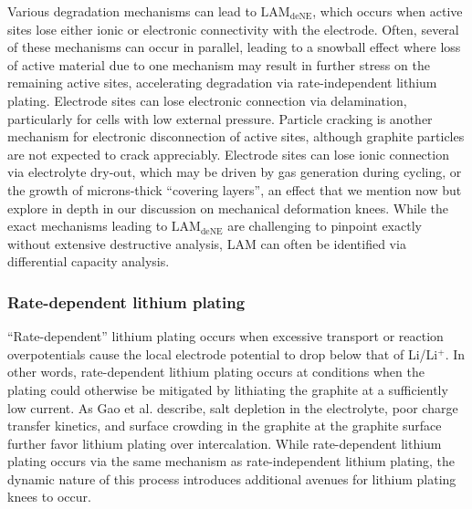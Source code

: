 \documentclass[journal=jpclcd,manuscript=article]{achemso}
\begin{document}
Various degradation mechanisms can lead to $\mathrm{LAM_{deNE}}$, which occurs when active sites lose either ionic or electronic connectivity with the electrode.
Often, several of these mechanisms can occur in parallel, leading to a snowball effect where loss of active material due to one mechanism may result in further stress on the remaining active sites, accelerating degradation via rate-independent lithium plating.
Electrode sites can lose electronic connection via delamination\cite{liu_aging_2010, cannarella_stress_2014, somerville_effect_2016, willenberg_high-precision_2020}, particularly for cells with low external pressure\cite{cannarella_stress_2014}. Particle cracking is another mechanism for electronic disconnection of active sites, although graphite particles are not expected to crack appreciably.\cite{takahashi_examination_2015}
Electrode sites can lose ionic connection via electrolyte dry-out, which may be driven by gas generation during cycling\cite{mao_calendar_2017, kupper_end--life_2018}, or the growth of microns-thick ``covering layers'', an effect that we mention now but explore in depth in our discussion on mechanical deformation knees.
While the exact mechanisms leading to $\mathrm{LAM_{deNE}}$ are challenging to pinpoint exactly without extensive destructive analysis, LAM can often be identified via differential capacity analysis.\cite{ansean_operando_2017, dubarry_durability_2018, baure_synthetic_2019, dubarry_big_2020}

\subsubsection{Rate-dependent lithium plating}

``Rate-dependent'' lithium plating occurs when excessive transport or reaction overpotentials cause the local electrode potential to drop below that of Li/Li$\mathrm{^+}$.
In other words, rate-dependent lithium plating occurs at conditions when the plating could otherwise be mitigated by lithiating the graphite at a sufficiently low current. As Gao et al.\cite{gao_interplay_2021} describe, salt depletion in the electrolyte, poor charge transfer kinetics, and surface crowding in the graphite at the graphite surface further favor lithium plating over intercalation. While rate-dependent lithium plating occurs via the same mechanism as rate-independent lithium plating, the dynamic nature of this process introduces additional avenues for lithium plating knees to occur.
\end{document}
